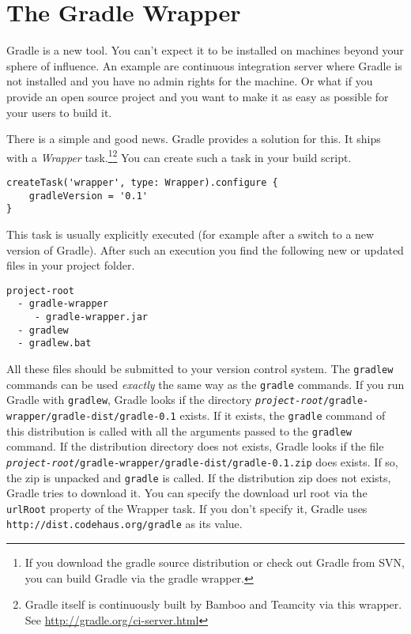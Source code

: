 \chapter{The Gradle Wrapper} %
\label{cha:the_gradle_wrapper}
Gradle is a new tool. You can't expect it to be installed on machines beyond your sphere of influence. An example are continuous integration server where Gradle is not installed and you have no admin rights for the machine. Or what if you provide an open source project and you want to make it as easy as possible for your users to build it.

There is a simple and good news. Gradle provides a solution for this. It ships with a \emph{Wrapper} task.\footnote{If you download the gradle source distribution or check out Gradle from SVN, you can build Gradle via the gradle wrapper.}\footnote{Gradle itself is continuously built by Bamboo and Teamcity via this wrapper. See \url{http://gradle.org/ci-server.html}} You can create such a task in your build script.
\begin{Verbatim}
createTask('wrapper', type: Wrapper).configure {
    gradleVersion = '0.1'
}	
\end{Verbatim}
This task is usually explicitly executed (for example after a switch to a new version of Gradle). After such an execution you find the following new or updated files in your project folder.
\begin{Verbatim}
project-root
  - gradle-wrapper
     - gradle-wrapper.jar
  - gradlew
  - gradlew.bat
\end{Verbatim}
\noindent
All these files should be submitted to your version control system. The \texttt{gradlew} commands can be used \emph{exactly} the same way as the \texttt{gradle} commands. If you run Gradle with \texttt{gradlew}, Gradle looks if the directory \texttt{\emph{project-root}/gradle-wrapper/gradle-dist/gradle-0.1} exists. If it exists, the \texttt{gradle} command of this distribution is called with all the arguments passed to the \texttt{gradlew} command.
If the distribution directory does not exists, Gradle looks if the file \texttt{\emph{project-root}/gradle-wrapper/gradle-dist/gradle-0.1.zip} does exists. If so, the zip is unpacked and \texttt{gradle} is called. If the distribution zip does not exists, Gradle tries to download it. You can specify the download url root via the \texttt{urlRoot} property of the Wrapper task. If you don't specify it, Gradle uses \texttt{http://dist.codehaus.org/gradle} as its value. 

